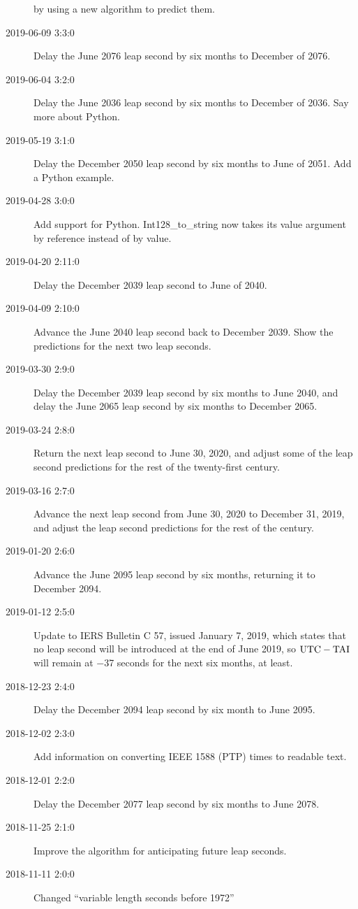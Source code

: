 \documentclass[letterpaper,twoside]{article}
\begin{document}
\begin{description}
  by using a new algorithm to predict them.
\item[2019-06-09 3:3:0] Delay the June 2076 leap second by
  six months to December of 2076.
\item[2019-06-04 3:2:0] Delay the June 2036 leap second by
  six months to December of 2036.  Say more about Python.
\item[2019-05-19 3:1:0] Delay the December 2050 leap second
  by six months to June of 2051.  Add a Python example.
\item[2019-04-28 3:0:0] Add support for Python.  Int128\_to\_string
  now takes its value argument by reference instead of by value.
\item[2019-04-20 2:11:0] Delay the December 2039 leap second
  to June of 2040.
\item[2019-04-09 2:10:0] Advance the June 2040 leap second back to
  December 2039.  Show the predictions for the next two leap seconds.
\item[2019-03-30 2:9:0] Delay the December 2039 leap second by six
  months to June 2040, and delay the June 2065 leap second by six
  months to December 2065.
\item[2019-03-24 2:8:0] Return the next leap second to June 30, 2020,
  and adjust some of the leap second predictions for the rest of the
  twenty-first century.
\item[2019-03-16 2:7:0] Advance the next leap second from June 30, 2020
  to December 31, 2019, and adjust the leap second predictions
  for the rest of the century.
\item[2019-01-20 2:6:0] Advance the June 2095 leap second by six
  months, returning it to December 2094.
\item[2019-01-12 2:5:0] Update to IERS Bulletin C 57, issued January
  7, 2019, which states that no leap second will be introduced
  at the end of June 2019, so $\rm{UTC}-\rm{TAI}$ will remain at
  \num{-37} seconds for the next six months, at least.  
\item[2018-12-23 2:4:0] Delay the December 2094 leap second by six month
  to June 2095.
\item[2018-12-02 2:3:0] Add information on converting IEEE 1588 (PTP)
  times to readable text.
\item[2018-12-01 2:2:0] Delay the December 2077 leap second by
  six months to June 2078.
\item[2018-11-25 2:1:0] Improve the algorithm for anticipating future
  leap seconds.
\item[2018-11-11 2:0:0] Changed ``variable length seconds before 1972''

\end{description}
\end{document}
